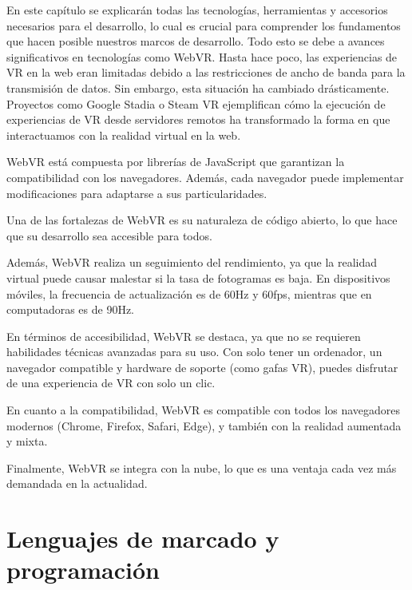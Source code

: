 \documentclass[a4paper, 12pt]{book}
\begin{document}
En este capítulo se explicarán todas las tecnologías, herramientas y accesorios necesarios para el desarrollo, lo cual es crucial para 
comprender los fundamentos que hacen posible nuestros marcos de desarrollo. Todo esto se debe a avances significativos en tecnologías como WebVR. 
Hasta hace poco, las experiencias de VR en la web eran limitadas debido a las restricciones de ancho de banda para la transmisión de datos. 
Sin embargo, esta situación ha cambiado drásticamente. Proyectos como Google Stadia o Steam VR ejemplifican cómo la ejecución de experiencias de VR 
desde servidores remotos ha transformado la forma en que interactuamos con la realidad virtual en la web.

\bigskip

WebVR está compuesta por librerías de JavaScript que garantizan la compatibilidad con los navegadores. Además, cada navegador puede implementar 
modificaciones para adaptarse a sus particularidades.

\bigskip

Una de las fortalezas de WebVR es su naturaleza de código abierto, lo que hace que su desarrollo sea accesible para todos.

\bigskip

Además, WebVR realiza un seguimiento del rendimiento, ya que la realidad virtual puede causar malestar si la tasa de fotogramas es baja. En dispositivos 
móviles, la frecuencia de actualización es de 60Hz y 60fps, mientras que en computadoras es de 90Hz.

\bigskip

En términos de accesibilidad, WebVR se destaca, ya que no se requieren habilidades técnicas avanzadas para su uso. Con solo tener un ordenador, 
un navegador compatible y hardware de soporte (como gafas VR), puedes disfrutar de una experiencia de VR con solo un clic.

\bigskip

En cuanto a la compatibilidad, WebVR es compatible con todos los navegadores modernos (Chrome, Firefox, Safari, Edge), y también con la realidad 
aumentada y mixta.

\bigskip

Finalmente, WebVR se integra con la nube, lo que es una ventaja cada vez más demandada en la actualidad.


\section{Lenguajes de marcado y programación} 
\label{sec:lenguajes}
\end{document}
